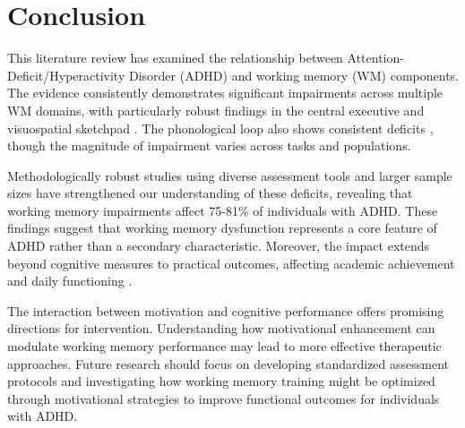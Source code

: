 \documentclass[stu]{apa7}
\begin{document}


\section{Conclusion}

This literature review has examined the relationship between Attention-Deficit/Hyperactivity Disorder (ADHD) and working memory (WM) components. The evidence consistently demonstrates significant impairments across multiple WM domains, with particularly robust findings in the central executive \parencite{mccabe_relationship_2010} and visuospatial sketchpad \parencite{butzbach_basic_2019}. The phonological loop also shows consistent deficits \parencite{friedman_reading_2017}, though the magnitude of impairment varies across tasks and populations.

Methodologically robust studies using diverse assessment tools and larger sample sizes \parencite{fried_clinical_2016} have strengthened our understanding of these deficits, revealing that working memory impairments affect 75-81\% of individuals with ADHD. These findings suggest that working memory dysfunction represents a core feature of ADHD rather than a secondary characteristic. Moreover, the impact extends beyond cognitive measures to practical outcomes, affecting academic achievement and daily functioning \parencite{kofler_working_2020}.

The interaction between motivation and cognitive performance \parencite{engelmann_motivation_2007} offers promising directions for intervention. Understanding how motivational enhancement can modulate working memory performance may lead to more effective therapeutic approaches. Future research should focus on developing standardized assessment protocols and investigating how working memory training might be optimized through motivational strategies to improve functional outcomes for individuals with ADHD.





\printbibliography
\end{document}
